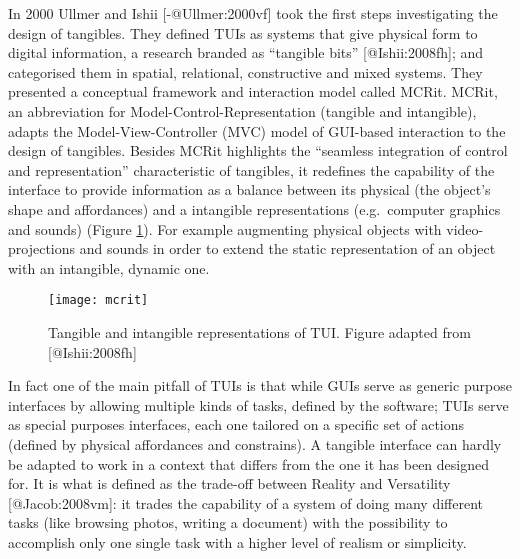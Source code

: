 In 2000 Ullmer and Ishii {[}-@Ullmer:2000vf{]} took the first steps
investigating the design of tangibles. They defined TUIs as systems that
give physical form to digital information, a research branded as
``tangible bits'' {[}@Ishii:2008fh{]}; and categorised them in spatial,
relational, constructive and mixed systems. They presented a conceptual
framework and interaction model called MCRit. MCRit, an abbreviation for
Model-Control-Representation (tangible and intangible), adapts the
Model-View-Controller (MVC) model of GUI-based interaction to the design
of tangibles. Besides MCRit highlights the ``seamless integration of
control and representation'' characteristic of tangibles, it redefines
the capability of the interface to provide information as a balance
between its physical (the object's shape and affordances) and a
intangible representations (e.g.~computer graphics and sounds) (Figure
\ref{fig:mcrit-model}). For example augmenting physical objects with
video-projections and sounds in order to extend the static
representation of an object with an intangible, dynamic one.

\begin{figure}[tbh]
    \centering
    \texttt{[image: mcrit]}
    \caption{Tangible and intangible representations of TUI. Figure adapted from [@Ishii:2008fh]  \protect\cite{Ishii:2008fh}}
    \label{fig:mcrit-model}
\end{figure}

In fact one of the main pitfall of TUIs is that while GUIs serve as
generic purpose interfaces by allowing multiple kinds of tasks, defined
by the software; TUIs serve as special purposes interfaces, each one
tailored on a specific set of actions (defined by physical affordances
and constrains). A tangible interface can hardly be adapted to work in a
context that differs from the one it has been designed for. It is what
is defined as the trade-off between Reality and Versatility
{[}@Jacob:2008vm{]}: it trades the capability of a system of doing many
different tasks (like browsing photos, writing a document) with the
possibility to accomplish only one single task with a higher level of
realism or simplicity.

